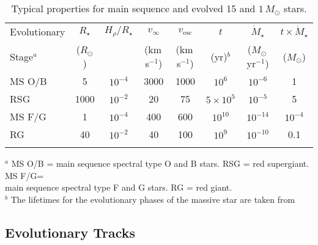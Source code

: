 \begin{table}[!hbt]
\begin{center}
\caption[Properties of main sequence and evolved stars]
{Typical properties for main sequence and evolved 15 and $1\,M_{\odot}$ stars.}
\begin{tabular}{lccccccc}
\hline
\hline
\rule{0pt}{2.5ex}Evolutionary & $R_{\star}$ & $H_{\rho}/R_{\star}$ & $v_{\infty}$ & $v_{\mathrm{esc}}$ &$t$ & $\dot{M}_{\star}$& $t \times \dot{M}_{\star}$\\
 Stage$^{a}$ & ($R_{\odot}$) &  & (km\,s$^{-1}$) & (km\,s$^{-1}$) & (yr)$^{b}$  & ($M_{\odot}$\,yr$^{-1}$)& ($M_{\odot}$) \\
\hline
\rule{0pt}{2.5ex}MS O/B &5 &  $10^{-4}$ & 3000 & 1000&$10^{6}$ & $10^{-6}$&1\\
RSG & 1000 & $10^{-2}$& 20 & 75& $5\times10^{5}$&$10^{-5}$ &5\\ 
\hline
\rule{0pt}{2.5ex}MS F/G & 1 &$10^{-4}$ & 400& 600& $10^{10}$ &$10^{-14}$ &$10^{-4}$\\ 
RG & 40 & $10^{-2}$& 40& 100& $10^{9}$ & $10^{-10}$&0.1\\ 
\hline
\hline
\rule{0pt}{2.0ex}
\end{tabular}
\label{tab:1.1}
\begin{minipage}{19.5cm}
{\footnotesize \vspace{-0.4cm} $^{a}$ MS O/B = main sequence spectral type O and B stars. RSG = red supergiant. MS F/G= \\
main sequence spectral type F and G stars. RG = red giant.\\
\footnotesize  $^{b}$ The lifetimes for the evolutionary phases of the massive star are taken from \\ \cite{stothers_1969}}
\end{minipage}
\end{center}
\end{table}
\vspace{-0.5cm}

\subsection{Evolutionary Tracks}\label{sec:1.5.2}

